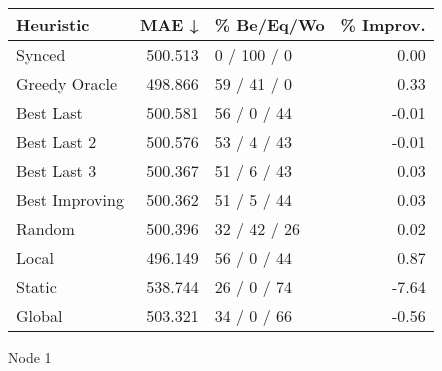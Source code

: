 \begin{tabular}{lrlr}
\toprule
\textbf{Heuristic} & \textbf{MAE ↓} & \textbf{\% Be/Eq/Wo} & \textbf{\% Improv.} \\
\midrule
            Synced &        500.513 &          0 / 100 / 0 &                0.00 \\
     Greedy Oracle &        498.866 &          59 / 41 / 0 &                0.33 \\
         Best Last &        500.581 &          56 / 0 / 44 &               -0.01 \\
       Best Last 2 &        500.576 &          53 / 4 / 43 &               -0.01 \\
       Best Last 3 &        500.367 &          51 / 6 / 43 &                0.03 \\
    Best Improving &        500.362 &          51 / 5 / 44 &                0.03 \\
            Random &        500.396 &         32 / 42 / 26 &                0.02 \\
             Local &        496.149 &          56 / 0 / 44 &                0.87 \\
            Static &        538.744 &          26 / 0 / 74 &               -7.64 \\
            Global &        503.321 &          34 / 0 / 66 &               -0.56 \\
\bottomrule
\end{tabular}
\caption{Node 1}
\label{tab:iid_lr01_le2_bs2_1}
